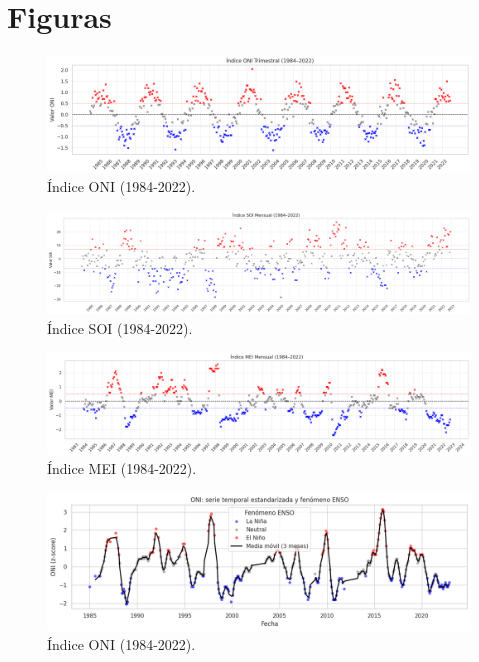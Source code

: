 
\chapter{Figuras} %

\label{AppendixA} %

\begin{figure}[ht]
        \centering
        \includegraphics[scale=.38]
        {Figures/fig13_oni.png}
        \caption{Índice ONI (1984-2022).}
        \label{fig:indice_oni}
\end{figure}

\begin{figure}[ht]
        \centering
        \includegraphics[scale=.26]
        {Figures/fig14_soi.png}
        \caption{Índice SOI (1984-2022).}
        \label{fig:indice_soi}
\end{figure}

\begin{figure}[ht]
        \centering
        \includegraphics[scale=.32]
        {Figures/fig15_mei.png}
        \caption{Índice MEI (1984-2022).}
        \label{fig:indice_mei}
\end{figure}

\begin{figure}[ht]
        \centering
        \includegraphics[scale=.45]
        {Figures/fig17_ts_oni.png}
        \caption{Índice ONI (1984-2022).}
        \label{fig:indice_oni_ts}
\end{figure}

